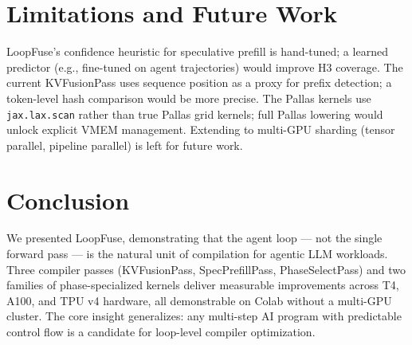 \documentclass[10pt,twocolumn]{article}
\begin{document}
\section{Limitations and Future Work}

LoopFuse's confidence heuristic for speculative prefill is hand-tuned; a
learned predictor (e.g., fine-tuned on agent trajectories) would improve H3
coverage. The current KVFusionPass uses sequence position as a proxy for
prefix detection; a token-level hash comparison would be more precise.
The Pallas kernels use \texttt{jax.lax.scan} rather than true Pallas grid
kernels; full Pallas lowering would unlock explicit VMEM management.
Extending to multi-GPU sharding (tensor parallel, pipeline parallel) is
left for future work.

\section{Conclusion}

We presented LoopFuse, demonstrating that the agent loop — not the single
forward pass — is the natural unit of compilation for agentic LLM workloads.
Three compiler passes (KVFusionPass, SpecPrefillPass, PhaseSelectPass) and
two families of phase-specialized kernels deliver measurable improvements
across T4, A100, and TPU v4 hardware, all demonstrable on Colab without a
multi-GPU cluster. The core insight generalizes: any multi-step AI program
with predictable control flow is a candidate for loop-level compiler optimization.
\end{document}
